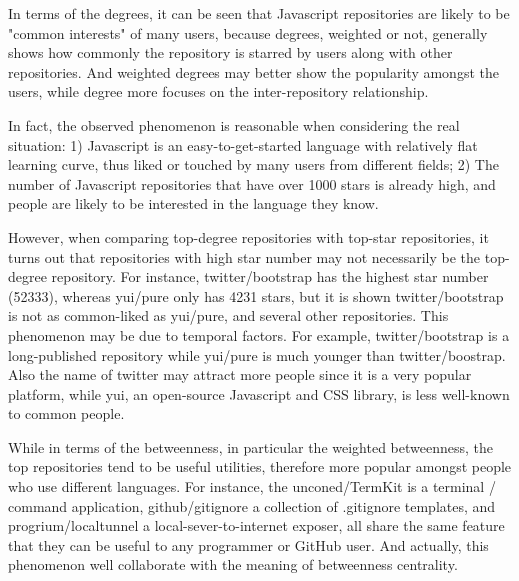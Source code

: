 \documentclass[11pt]{article}
\begin{document}
In terms of the degrees, it can be seen that Javascript repositories are likely to be "common interests" of many users, because degrees, weighted or not, generally shows how commonly the repository is starred by users along with other repositories. And weighted degrees may better show the popularity amongst the users, while degree more focuses on the inter-repository relationship.

In fact, the observed phenomenon is reasonable when considering the real situation: 1) Javascript is an easy-to-get-started language with relatively flat learning curve, thus liked or touched by many users from different fields; 2) The number of Javascript repositories that have over 1000 stars is already high, and people are likely to be interested in the language they know.

However, when comparing top-degree repositories with top-star repositories, it turns out that repositories with high star number may not necessarily be the top-degree repository. For instance, twitter/bootstrap has the highest star number (52333), whereas yui/pure only has 4231 stars, but it is shown twitter/bootstrap is not as common-liked as yui/pure, and several other repositories. This phenomenon may be due to temporal factors. For example, twitter/bootstrap is a long-published repository while yui/pure is much younger than twitter/boostrap. Also the name of twitter may attract more people since it is a very popular platform, while yui, an open-source Javascript and CSS library, is less well-known to common people.

While in terms of the betweenness, in particular the weighted betweenness, the top repositories tend to be useful utilities, therefore more popular amongst people who use different languages. For instance, the unconed/TermKit is a terminal / command application, github/gitignore a collection of .gitignore templates, and progrium/localtunnel a local-sever-to-internet exposer, all share the same feature that they can be useful to any programmer or GitHub user. And actually, this phenomenon well collaborate with the meaning of betweenness centrality.
\end{document}
